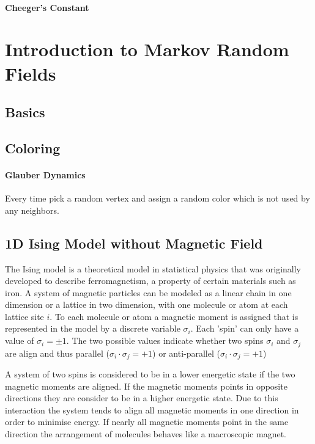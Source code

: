 \documentclass{article}
\theoremstyle{definition}
\newcommand{\<}{\left\langle}
\renewcommand{\>}{\right\rangle}
\begin{document}
\paragraph{Cheeger's Constant}


\section{Introduction to Markov Random Fields}
\subsection{Basics}


\subsection{Coloring}

\paragraph{Glauber Dynamics}
Every time pick a random vertex and assign a random color which is not used by any neighbors.


\subsection{1D Ising Model without Magnetic Field}
The Ising model is a theoretical model in statistical physics that was originally developed
to describe ferromagnetism, a property of certain materials such as iron. A system of magnetic particles can be modeled as a linear
chain in one dimension or a lattice in two dimension, with one molecule or atom at each
lattice site $i$. To each molecule or atom a magnetic moment is assigned that is represented
in the model by a discrete variable $\sigma_i$. Each 'spin' can only have a value of $\sigma_i = \pm 1$.
The two possible values indicate whether two spins $\sigma_i$ and $\sigma_j$ are align and thus parallel
($\sigma_i \cdot \sigma_j = +1$) or anti-parallel ($\sigma_i \cdot \sigma_j = +1$)

A system of two spins is considered to be in a lower energetic state if the two magnetic
moments are aligned. If the magnetic moments points in opposite directions they are
consider to be in a higher energetic state. Due to this interaction the system tends to
align all magnetic moments in one direction in order to minimise energy. If nearly all
magnetic moments point in the same direction the arrangement of molecules behaves like
a macroscopic magnet.
\end{document}
